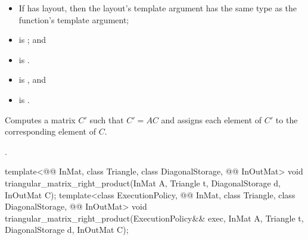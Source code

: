 \begin{itemdescr}
\pnum
\mandates
\begin{itemize}
\item
If  has  layout,
then the layout's  template argument has
the same type as the function's  template argument;
\item
{}
is ; and
\item
{} is .
\end{itemize}

\pnum
\expects
\begin{itemize}
\item
{} is , and
\item
{} is .
\end{itemize}

\pnum
\effects
Computes a matrix $C'$ such that $C' = A C$ and
assigns each element of $C'$ to the corresponding element of $C$.

\pnum
\complexity
{}.
\end{itemdescr}

\begin{itemdecl}
template<@@ InMat, class Triangle, class DiagonalStorage, @@ InOutMat>
  void triangular_matrix_right_product(InMat A, Triangle t, DiagonalStorage d, InOutMat C);
template<class ExecutionPolicy,
         @@ InMat, class Triangle, class DiagonalStorage, @@ InOutMat>
  void triangular_matrix_right_product(ExecutionPolicy&& exec,
                                       InMat A, Triangle t, DiagonalStorage d, InOutMat C);
\end{itemdecl}

